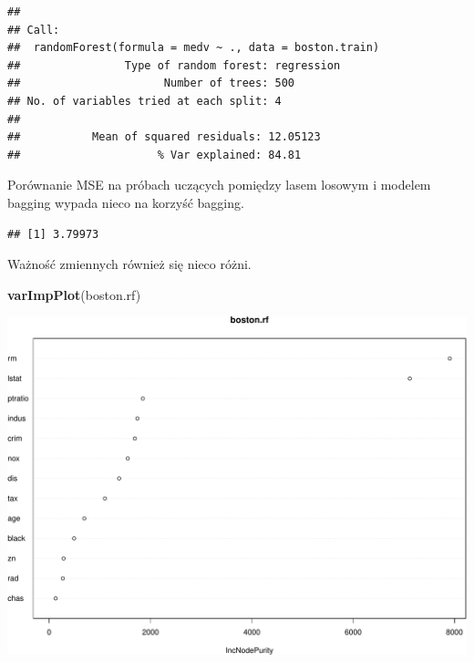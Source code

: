 \documentclass[
]{book}
\newenvironment{Shaded}{\begin{snugshade}}{\end{snugshade}}
\newcommand{\AttributeTok}[1]{\textcolor[rgb]{0.13,0.29,0.53}{#1}}
\newcommand{\FunctionTok}[1]{\textcolor[rgb]{0.13,0.29,0.53}{\textbf{#1}}}
\newcommand{\NormalTok}[1]{#1}
\newcommand{\OtherTok}[1]{\textcolor[rgb]{0.56,0.35,0.01}{#1}}
\newcommand{\SpecialCharTok}[1]{\textcolor[rgb]{0.81,0.36,0.00}{\textbf{#1}}}
\theoremstyle{plain}
\theoremstyle{definition}
\theoremstyle{definition}
\theoremstyle{definition}
\theoremstyle{definition}
\theoremstyle{definition}
\theoremstyle{remark}
\begin{document}
\begin{verbatim}
## 
## Call:
##  randomForest(formula = medv ~ ., data = boston.train) 
##                Type of random forest: regression
##                      Number of trees: 500
## No. of variables tried at each split: 4
## 
##           Mean of squared residuals: 12.05123
##                     % Var explained: 84.81
\end{verbatim}

Porównanie MSE na próbach uczących pomiędzy lasem losowym i modelem bagging wypada nieco na korzyść bagging.

\begin{Shaded}
\end{Shaded}

\begin{verbatim}
## [1] 3.79973
\end{verbatim}

Ważność zmiennych również się nieco różni.

\begin{Shaded}
\begin{Highlighting}[]
\FunctionTok{varImpPlot}\NormalTok{(boston.rf)}
\end{Highlighting}
\end{Shaded}

\includegraphics{EksploracjaDanych_files/figure-latex/unnamed-chunk-41-1.pdf}
\end{document}
